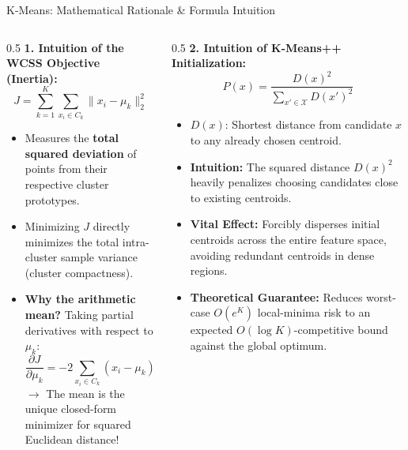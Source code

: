 \documentclass[aspectratio=169,10pt]{beamer}
\begin{document}
\begin{frame}{K-Means: Mathematical Rationale \& Formula Intuition}
  \footnotesize
  \begin{columns}[T]
    \begin{column}{0.5\textwidth}
      \textbf{1. Intuition of the WCSS Objective (Inertia):}
      $$J = \sum_{k=1}^K \sum_{x_i \in C_k} \|x_i - \mu_k\|_2^2$$
      \begin{itemize}\setlength{\itemsep}{1.5pt}
        \item Measures the \textbf{total squared deviation} of points from their respective cluster prototypes.
        \item Minimizing $J$ directly minimizes the total intra-cluster sample variance (cluster compactness).
        \item \textbf{Why the arithmetic mean?} Taking partial derivatives with respect to $\mu_k$:
          $$\frac{\partial J}{\partial \mu_k} = -2\sum_{x_i \in C_k} (x_i - \mu_k) = 0 \implies \mu_k = \frac{1}{|C_k|}\sum_{x_i \in C_k} x_i$$
          $\to$ The mean is the unique closed-form minimizer for squared Euclidean distance!
      \end{itemize}
    \end{column}
    \begin{column}{0.5\textwidth}
      \textbf{2. Intuition of K-Means++ Initialization:}
      $$P(x) = \frac{D(x)^2}{\sum_{x' \in \mathcal{X}} D(x')^2}$$
      \begin{itemize}\setlength{\itemsep}{1.5pt}
        \item $D(x)$: Shortest distance from candidate $x$ to any already chosen centroid.
        \item \textbf{Intuition:} The squared distance $D(x)^2$ heavily penalizes choosing candidates close to existing centroids.
        \item \textbf{Vital Effect:} Forcibly disperses initial centroids across the entire feature space, avoiding redundant centroids in dense regions.
        \item \textbf{Theoretical Guarantee:} Reduces worst-case $O(e^K)$ local-minima risk to an expected $O(\log K)$-competitive bound against the global optimum.
      \end{itemize}
    \end{column}
  \end{columns}
\end{frame}
\end{document}
